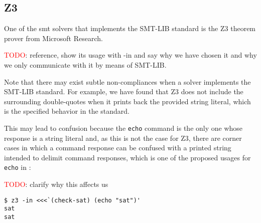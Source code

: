 \subsection{Z3}

One of the \acrshort{smt} solvers that implements the SMT-LIB standard is the Z3
theorem prover from Microsoft Research.

\textcolor{red}{TODO}: reference, show its usage with -in and say why we have
chosen it and why we only communicate with it by means of SMT-LIB.

Note that there may exist subtle non-compliances when a solver implements the
SMT-LIB standard. For example, we have found that Z3 does not include the
surrounding double-quotes when it prints back the provided string literal, which
is the specified behavior in the standard.

This may lead to confusion because the \verb|echo| command is the only one whose
response is a string literal and, as this is not the case for Z3, there are 
corner cases in which a command response can be confused with a printed string
intended to delimit command responses, which is one of the proposed usages for
\verb|echo| in \cite{smtLibStandard}:

\textcolor{red}{TODO}: clarify why this affects us

\begin{verbatim}
$ z3 -in <<<`(check-sat) (echo "sat")'
sat
sat
\end{verbatim}
